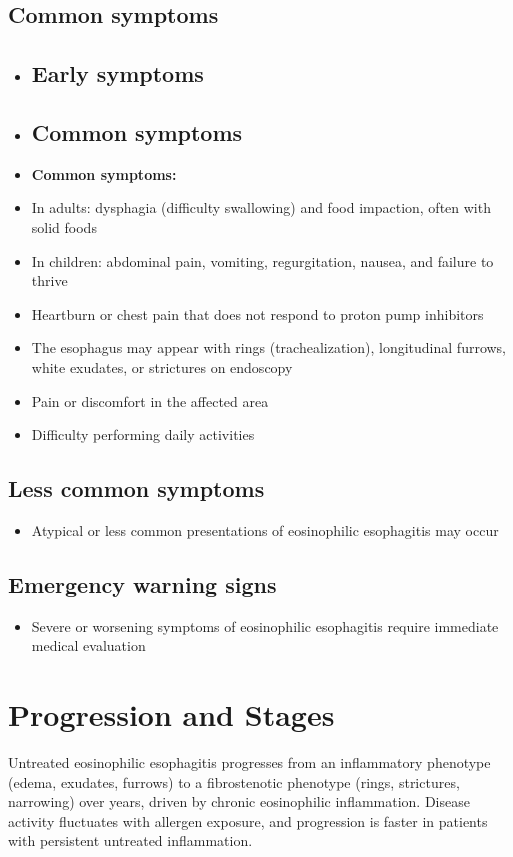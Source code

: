 \subsection{Common symptoms}
\begin{itemize}[noitemsep]
  \item \subsection{Early symptoms}
  \item \subsection{Common symptoms}
  \item \textbf{Common symptoms:}
  \item In adults: dysphagia (difficulty swallowing) and food impaction, often with solid foods
  \item In children: abdominal pain, vomiting, regurgitation, nausea, and failure to thrive
  \item Heartburn or chest pain that does not respond to proton pump inhibitors
  \item The esophagus may appear with rings (trachealization), longitudinal furrows, white exudates, or strictures on endoscopy
  \item Pain or discomfort in the affected area
  \item Difficulty performing daily activities
\end{itemize}

\subsection{Less common symptoms}
\begin{itemize}[noitemsep]
  \item Atypical or less common presentations of eosinophilic esophagitis may occur
\end{itemize}

\subsection{Emergency warning signs}
\begin{itemize}[noitemsep]
  \item Severe or worsening symptoms of eosinophilic esophagitis require immediate medical evaluation
\end{itemize}
\section{Progression and Stages}
Untreated eosinophilic esophagitis progresses from an inflammatory phenotype (edema, exudates, furrows) to a fibrostenotic phenotype (rings, strictures, narrowing) over years, driven by chronic eosinophilic inflammation. Disease activity fluctuates with allergen exposure, and progression is faster in patients with persistent untreated inflammation.

